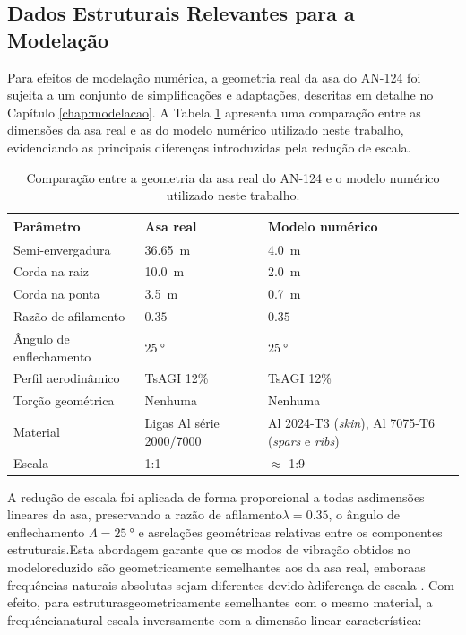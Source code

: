 \documentclass[a4paper,fleqn]{cas-sc}
\begin{document}
\subsection{Dados Estruturais Relevantes para a Modelação}

Para efeitos de modelação numérica, a geometria real da asa do AN-124 foi sujeita a um conjunto de simplificações e adaptações, descritas em detalhe no Capítulo \ref{chap:modelacao}. A Tabela \ref{tab:modelo_vs_real} apresenta uma comparação entre as dimensões da asa real e as do modelo numérico utilizado neste trabalho, evidenciando as principais diferenças introduzidas pela redução de escala.

\begin{table}
\centering
\caption{Comparação entre a geometria da asa real do AN-124 e o 
modelo numérico utilizado neste trabalho.}
\label{tab:modelo_vs_real}
\renewcommand{\arraystretch}{1.4}
\begin{tabularx}{\textwidth}{p{4.5cm} X X}
\toprule
\textbf{Parâmetro} & \textbf{Asa real} & \textbf{Modelo numérico} \\
\midrule
Semi-envergadura        & \SI{36.65}{\meter}    & \SI{4.0}{\meter} \\
Corda na raiz           & \SI{10.0}{\meter}     & \SI{2.0}{\meter} \\
Corda na ponta          & \SI{3.5}{\meter}      & \SI{0.7}{\meter} \\
Razão de afilamento     & $0.35$                & $0.35$ \\
Ângulo de enflechamento & $\qty{25}{\degree}$   & $\qty{25}{\degree}$ \\
Perfil aerodinâmico     & TsAGI 12\%            & TsAGI 12\% \\
Torção geométrica       & Nenhuma               & Nenhuma \\
Material & Ligas Al série 2000/7000 & Al 2024-T3 (\textit{skin}), Al 7075-T6 (\textit{spars} e \textit{ribs}) \\
Escala                  & 1:1                   & $\approx$ 1:9 \\
\bottomrule
\end{tabularx}
\end{table}

A redução de escala foi aplicada de forma proporcional a todas asdimensões lineares da asa, preservando a razão de afilamento$\lambda = 0.35$, o ângulo de enflechamento $\Lambda = \qty{25}{\degree}$ e asrelações geométricas relativas entre os componentes estruturais.Esta abordagem garante que os modos de vibração obtidos no modeloreduzido são geometricamente semelhantes aos da asa real, emboraas frequências naturais absolutas sejam diferentes devido àdiferença de escala \cite{Craig2006}. Com efeito, para estruturasgeometricamente semelhantes com o mesmo material, a frequêncianatural escala inversamente com a dimensão linear característica:
\end{document}
